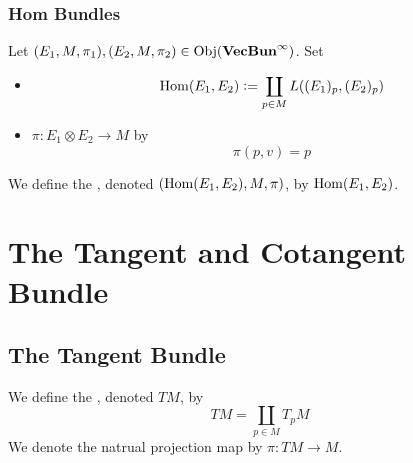 \documentclass{book}
\begin{document}
	
	
	
	
	
	
\subsection{Hom Bundles}
	
	\begin{defn}
		Let $(E_1, M, \pi_1), (E_2, M, \pi_2) \in \operatorname{Obj}(\operatorname*{\text{\textbf{VecBun}}^{\infty}})$. Set
		\begin{itemize}
			\item $$ \operatorname{Hom}(E_1, E_2) \vcentcolon= \coprod_{p \in M} L((E_1)_p, (E_2)_p)$$
			\item $\pi: E_1 \otimes E_2 \rightarrow M$ by 
			$$\pi(p, v) = p$$
		\end{itemize}
		We define the , denoted $(\operatorname{Hom}(E_1, E_2), M, \pi)$, by $\operatorname{Hom}(E_1, E_2)$. 
	\end{defn}

	
	
	
	
	
	
	
	
	
	
	
	
	
	
	
	
	
	
	
	
	
	
	
	
	
	
	
	
	
	
	
	
	
	
	
	
	
	
	
	
	
	
	
	
	
	
	
	\newpage
	
	\chapter{The Tangent and Cotangent Bundle}
	
	\section{The Tangent Bundle}
	\begin{defn}
		We define the , denoted $TM$, by $$TM = \coprod_{p \in M} T_pM$$ 
		We denote the natrual projection map by $\pi: TM \rightarrow M$.
	\end{defn}
	
\end{document}
